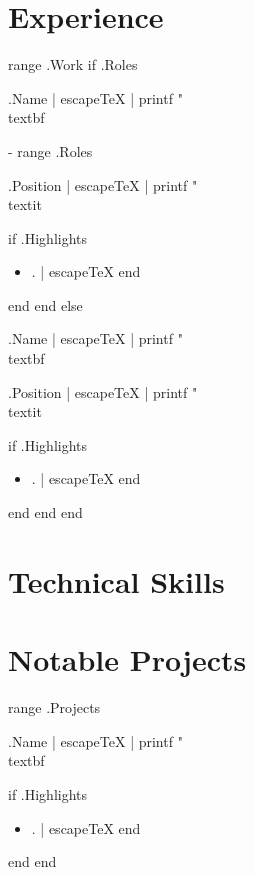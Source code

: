 \documentclass[10pt,a4paper]{article}
\begin{document}
\section*{Experience}
{{range .Work}}
{{if .Roles}}{{.Name | escapeTeX | printf "\\textbf{%
{{- range .Roles}}
{{.Position | escapeTeX | printf "\\textit{%
{{if .Highlights}}
\begin{itemize}
  \setlength\itemsep{0pt}
  {{range .Highlights}}
  \item {{. | escapeTeX}}
  {{end}}
\end{itemize}
{{end}}
{{end}}
{{else}}{{.Name | escapeTeX | printf "\\textbf{%
{{.Position | escapeTeX | printf "\\textit{%
{{if .Highlights}}
\begin{itemize}
  \setlength\itemsep{0pt}
  {{range .Highlights}}
  \item {{. | escapeTeX}}
  {{end}}
\end{itemize}
{{end}}
{{end}}
{{end}}

\section*{Technical Skills}


\section*{Notable Projects}
{{range .Projects}}
{{.Name | escapeTeX | printf "\\textbf{%
{{if .Highlights}}
\begin{itemize}
  \setlength\itemsep{-0.25em}
  {{range .Highlights}}
  \item {{. | escapeTeX}}
  {{end}}
\end{itemize}
{{end}}
{{end}}

}}}}}}}}}}}}}}}
\end{document}
